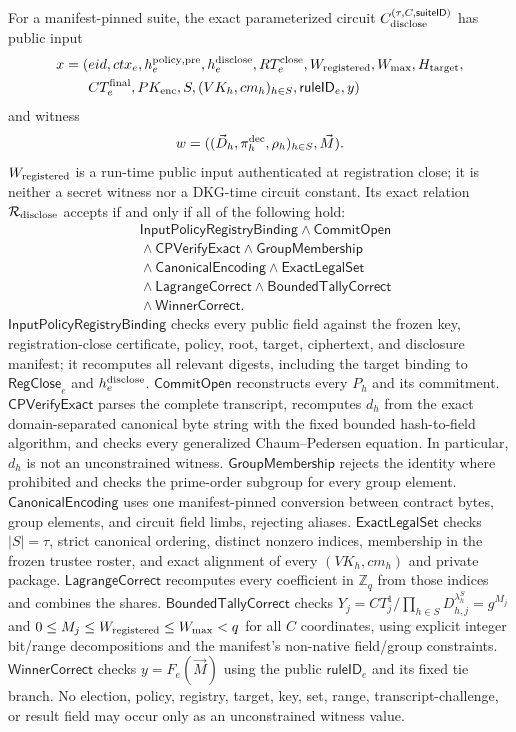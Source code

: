 \documentclass[pdflatex,sn-mathphys-num]{sn-jnl}%
\theoremstyle{thmstyleone}%
\theoremstyle{thmstyletwo}%
\theoremstyle{thmstylethree}%
\begin{document}
For a manifest-pinned suite, the exact parameterized circuit
$C_{\rm disclose}^{(\tau,C,\mathsf{suiteID})}$ has public input
\[
\begin{aligned}
 x=(&eid,ctx_e,h_e^{\rm policy,pre},h_e^{\rm disclose},RT_e^{\rm close},
      W_{\rm registered},W_{\max},H_{\rm target},\\
    &CT_e^{\rm final},PK_{\rm enc},S,(VK_h,cm_h)_{h\in S},
      \mathsf{ruleID}_e,y)
\end{aligned}
\]
and witness
\[
 w=((\vec D_h,\pi_h^{\rm dec},\rho_h)_{h\in S},\vec M).
\]
$W_{\rm registered}$ is a run-time public input authenticated at registration
close; it is neither a secret witness nor a DKG-time circuit constant.
Its exact relation $\mathcal R_{\rm disclose}$ accepts if and only if all of
the following hold:
\[
\boxed{\begin{aligned}
 &\mathsf{InputPolicyRegistryBinding}\land\mathsf{CommitOpen}\\
 &{}\land\mathsf{CPVerifyExact}\land\mathsf{GroupMembership}\\
 &{}\land\mathsf{CanonicalEncoding}\land\mathsf{ExactLegalSet}\\
 &{}\land\mathsf{LagrangeCorrect}\land\mathsf{BoundedTallyCorrect}\\
 &{}\land\mathsf{WinnerCorrect}.
\end{aligned}}
\]
$\mathsf{InputPolicyRegistryBinding}$ checks every public field against the
frozen key, registration-close certificate, policy, root, target, ciphertext,
and disclosure manifest; it recomputes all relevant digests, including the
target binding to $\mathsf{RegClose}_e$ and $h_e^{\rm disclose}$.
$\mathsf{CommitOpen}$ reconstructs every $P_h$ and its commitment.
$\mathsf{CPVerifyExact}$ parses the complete transcript, recomputes
$d_h$ from the exact domain-separated canonical byte string with the fixed
bounded hash-to-field algorithm, and checks every generalized
Chaum--Pedersen equation.  In particular, $d_h$ is not an unconstrained
witness.
$\mathsf{GroupMembership}$ rejects the identity where prohibited and checks
the prime-order subgroup for every group element.
$\mathsf{CanonicalEncoding}$ uses one manifest-pinned conversion between
contract bytes, group elements, and circuit field limbs, rejecting aliases.
$\mathsf{ExactLegalSet}$ checks $|S|=\tau$, strict canonical ordering, distinct
nonzero indices, membership in the frozen trustee roster, and exact alignment
of every $(VK_h,cm_h)$ and private package.
$\mathsf{LagrangeCorrect}$ recomputes every coefficient in $\mathbb Z_q$ from
those indices and combines the shares.
$\mathsf{BoundedTallyCorrect}$ checks
$Y_j=CT_j^1/\prod_{h\in S}D_{h,j}^{\lambda_h^S}=g^{M_j}$ and
$0\leq M_j\leq W_{\rm registered}\leq W_{\max}<q$ for all $C$ coordinates,
using explicit integer bit/range decompositions and the manifest's non-native
field/group constraints.
$\mathsf{WinnerCorrect}$ checks $y=F_e(\vec M)$ using the public
$\mathsf{ruleID}_e$ and its fixed tie branch.  No election, policy, registry,
target, key, set, range, transcript-challenge, or result field may occur only
as an unconstrained witness value.
\end{document}
